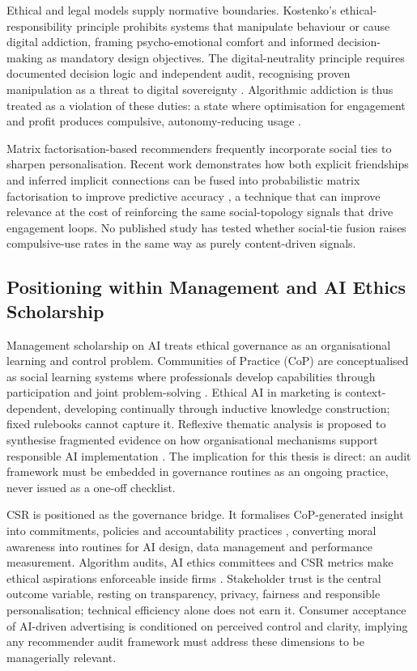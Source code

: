 \documentclass[11pt]{article}
\begin{document}
Ethical and legal models supply normative boundaries. Kostenko's ethical-responsibility principle \parencites[61--62]{2977039} prohibits systems that manipulate behaviour or cause digital addiction, framing psycho-emotional comfort and informed decision-making as mandatory design objectives. The digital-neutrality principle requires documented decision logic and independent audit, recognising proven manipulation as a threat to digital sovereignty \parencites[109]{2977039}. Algorithmic addiction is thus treated as a violation of these duties: a state where optimisation for engagement and profit produces compulsive, autonomy-reducing usage \parencites[61--62]{2977039}[109]{2977039}[19]{3303310}[2]{8958037}.

Matrix factorisation-based recommenders frequently incorporate social ties to sharpen personalisation. Recent work demonstrates how both explicit friendships and inferred implicit connections can be fused into probabilistic matrix factorisation to improve predictive accuracy \parencites[2]{8026166}, a technique that can improve relevance at the cost of reinforcing the same social-topology signals that drive engagement loops. No published study has tested whether social-tie fusion raises compulsive-use rates in the same way as purely content-driven signals.

\subsection{Positioning within Management and AI Ethics Scholarship}
\label{sec:positioning_mgmt_ai_ethics} Management scholarship on AI treats ethical governance as an organisational learning and control problem. Communities of Practice (CoP) are conceptualised as social learning systems where professionals develop capabilities through participation and joint problem-solving \parencites[3]{8200246}. Ethical AI in marketing is context-dependent, developing continually through inductive knowledge construction; fixed rulebooks cannot capture it. Reflexive thematic analysis is proposed to synthesise fragmented evidence on how organisational mechanisms support responsible AI implementation \parencites[8]{8200246}. The implication for this thesis is direct: an audit framework must be embedded in governance routines as an ongoing practice, never issued as a one-off checklist.

CSR is positioned as the governance bridge. It formalises CoP-generated insight into commitments, policies and accountability practices \parencites[16]{8200246}[11]{8200246}, converting moral awareness into routines for AI design, data management and performance measurement. Algorithm audits, AI ethics committees and CSR metrics make ethical aspirations enforceable inside firms \parencites[16]{8200246}. Stakeholder trust is the central outcome variable, resting on transparency, privacy, fairness and responsible personalisation; technical efficiency alone does not earn it. Consumer acceptance of AI-driven advertising \parencites[16]{8200246}[11]{8200246}[3]{8200246} is conditioned on perceived control and clarity, implying any recommender audit framework must address these dimensions to be managerially relevant.
\end{document}
